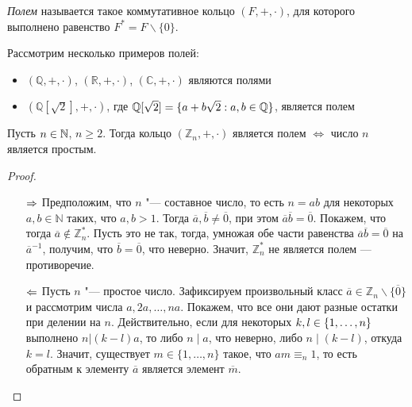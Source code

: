 \begin{definition}
	\textit{Полем} называется такое коммутативное кольцо $(F, +, \cdot)$, для которого выполнено равенство $F^* = F\backslash\{0\}$.
\end{definition}

\begin{example}
	Рассмотрим несколько примеров полей:
	\begin{itemize}
		\item $(\mathbb{Q}, +, \cdot)$, $(\mathbb{R}, +, \cdot)$, $(\mathbb{C}, +, \cdot)$ являются полями
		\item $(\mathbb{Q}[\sqrt{2}], +, \cdot)$, где $\mathbb{Q}[\sqrt 2] = \{a + b\sqrt{2}: a, b \in \mathbb{Q}\}$, является полем
	\end{itemize}
\end{example}

\begin{proposition}
	Пусть $n \in \mathbb{N}$, $n \ge 2$. Тогда кольцо $(\mathbb{Z}_n, +, \cdot)$ является полем $\Leftrightarrow$ число $n$ является простым.
\end{proposition}

\begin{proof}~
	\begin{itemize}
		\item[$\Rightarrow$]Предположим, что $n$ "--- составное число, то есть $n = ab$ для некоторых $a, b \in \mathbb{N}$ таких, что $a, b > 1$. Тогда $\overline{a}, \overline{b} \ne \overline{0}$, при этом $\overline{a}\overline{b} = \overline{0}$. Покажем, что тогда $\overline{a} \not\in \mathbb{Z}_n^*$. Пусть это не так, тогда, умножая обе части равенства $\overline{a}\overline{b} = \overline{0}$ на $\overline{a}^{-1}$, получим, что $\overline{b} = \overline{0}$, что неверно. Значит, $\mathbb{Z}_n^*$ не является полем --- противоречие.
		
		\item[$\Leftarrow$]Пусть $n$ "--- простое число. Зафиксируем произвольный класс $\overline{a} \in \mathbb{Z}_n \backslash \{\overline 0\}$ и рассмотрим числа $a, 2a, \dots, na$. Покажем, что все они дают разные остатки при делении на $n$. Действительно, если для некоторых $k, l \hm{\in} \{1, \dots, n\}$ выполнено $n|(k-l)a$, то либо $n \mid a$, что неверно, либо $n \mid (k - l)$, откуда $k = l$. Значит, существует $m \in \{1, \dots, n\}$ такое, что $am \equiv_n 1$, то есть обратным к элементу $\overline{a}$ является элемент $\overline{m}$.\qedhere
	\end{itemize}
\end{proof}

